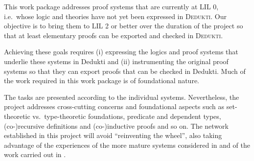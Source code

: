 \begin{workpackage}[id=theories,type=RTD,
  short=Theories,%
  title= Theories,
  lead=Inn,
  BiaRM=70,
  BirRM=3,
  IasRM=5,
  InnRM=9,
  InrRM=83,
  LeeRM=3,
  LmuRM=16,
  MedRM=4,
  ProRM=11,
  RunRM=7,
  wphases=1-48,
  ]

\begin{wpobjectives}
  This work package addresses proof systems that are currently at LIL 0, i.e.\
  whose logic and theories have not yet been expressed in \textsc{Dedukti}. Our
  objective is to bring them to LIL 2 or better over the duration of the
  project so that at least elementary proofs can be exported and checked in
  \textsc{Dedukti}.

  Achieving these goals requires (i) expressing the logics and proof systems
  that underlie these systems in Dedukti and
  (ii) instrumenting the original proof systems so that they can export proofs
  that can be checked in Dedukti. Much of the work required in this work package
  is of foundational nature.
\end{wpobjectives}
\begin{wpdescription}
  The tasks are presented according to the individual systems. Nevertheless,
  the project addresses cross-cutting concerns and foundational aspects such
  as set-theoretic vs.\ type-theoretic foundations, predicate and dependent
  types, (co-)recursive definitions and (co-)inductive proofs and so on. The
  network established in this project will avoid ``reinventing the wheel'', also
  taking advantage of the experiences of the more mature systems considered in
  \WPref{instrumentation} and of the work carried out in \WPref{atpetc}.
\end{wpdescription}

\begin{tasklist}
%   


\end{tasklist}
\end{workpackage}
